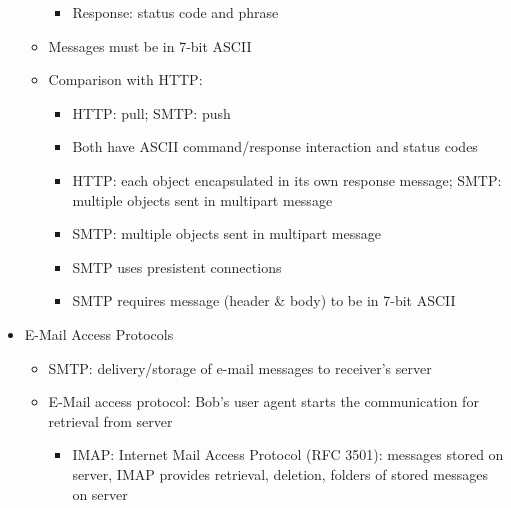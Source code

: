 \begin{itemize}
\begin{itemize}
\begin{itemize}
          \item Response: status code and phrase

        \end{itemize}

      \item Messages must be in 7-bit ASCII

      \item Comparison with HTTP:

        \begin{itemize}

          \item HTTP: pull; SMTP: push

          \item Both have ASCII command/response interaction and status codes

          \item HTTP: each object encapsulated in its own response message; SMTP: multiple objects sent in multipart message

          \item SMTP: multiple objects sent in multipart message

          \item SMTP uses presistent connections

          \item SMTP requires message (header \& body) to be in 7-bit ASCII

        \end{itemize}

    \end{itemize}

  \item E-Mail Access Protocols

    \begin{itemize}

      \item SMTP: delivery/storage of e-mail messages to receiver's server

      \item E-Mail access protocol: Bob's user agent starts the communication for retrieval from server

        \begin{itemize}

          \item IMAP: Internet Mail Access Protocol (RFC 3501): messages stored on server, IMAP provides retrieval, deletion, folders of stored messages on server


\end{itemize}
\end{itemize}
\end{itemize}
